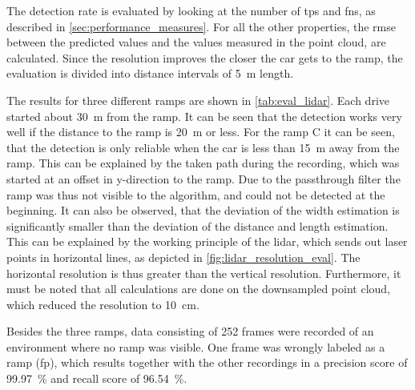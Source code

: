 The detection rate is evaluated by looking at the number of \glspl{tp} and \glspl{fn}, as described in \cref{sec:performance_measures}.
For all the other properties, the \gls{rmse} between the predicted values and the values measured in the point cloud, are calculated.
Since the resolution improves the closer the car gets to the ramp, the evaluation is divided into distance intervals of \SI{5}{\metre} length.

The results for three different ramps are shown in \cref{tab:eval_lidar}.
Each drive started about \SI{30}{\metre} from the ramp.
It can be seen that the detection works very well if the distance to the ramp is \SI{20}{\metre} or less.
For the ramp C it can be seen, that the detection is only reliable when the car is less than \SI{15}{\metre} away from the ramp.
This can be explained by the taken path during the recording, which was started at an offset in y-direction to the ramp.
Due to the passthrough filter the ramp was thus not visible to the algorithm, and could not be detected at the beginning.
It can also be observed, that the deviation of the width estimation is significantly smaller than the deviation of the distance and length estimation.
This can be explained by the working principle of the \gls{lidar}, which sends out laser points in horizontal lines, as depicted in \cref{fig:lidar_resolution_eval}.
The horizontal resolution is thus greater than the vertical resolution.
Furthermore, it must be noted that all calculations are done on the downsampled point cloud, which reduced the resolution to \SI{10}{\cm}.

Besides the three ramps, data consisting of 252 frames were recorded of an environment where no ramp was visible.
One frame was wrongly labeled as a ramp (\gls{fp}), which results together with the other recordings in a precision score of \SI{99.97}{\percent} and recall score of \SI{96.54}{\percent}.

